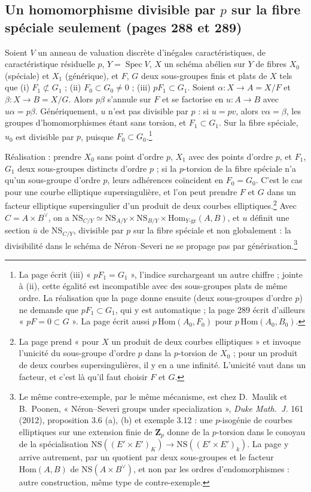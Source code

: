 \documentclass[11pt,a4paper]{article}
\begin{document}
\subsection*{Un homomorphisme divisible par $p$ sur la fibre spéciale seulement (pages 288 et 289)}

Soient $V$ un anneau de valuation discrète d'inégales caractéristiques,
de caractéristique résiduelle $p$, $Y = \operatorname{Spec} V$, $X$ un schéma
abélien sur $Y$ de fibres $X_0$ (spéciale) et $X_1$ (générique), et $F$, $G$
deux sous-groupes finis et plats de $X$ tels que (i) $F_1 \not\subset G_1$ ;
(ii) $F_0 \subset G_0 \neq 0$ ; (iii) $pF_1 \subset G_1$. Soient
$\alpha \colon X \to A = X/F$ et $\beta \colon X \to B = X/G$. Alors $p\beta$
s'annule sur $F$ et se factorise en $u \colon A \to B$ avec
$u\alpha = p\beta$. Génériquement, $u$ n'est pas divisible par $p$ : si
$u = pv$, alors $v\alpha = \beta$, les groupes d'homomorphismes étant sans
torsion, et $F_1 \subset G_1$. Sur la fibre spéciale, $u_0$ est divisible par
$p$, puisque $F_0 \subset G_0$.\footnote{La page écrit (iii) « $pF_1 = G_1$ »,
l'indice surchargeant un autre chiffre ; jointe à (ii), cette égalité est
incompatible avec des sous-groupes plats de même ordre. La réalisation que la
page donne ensuite (deux sous-groupes d'ordre $p$) ne demande que
$pF_1 \subset G_1$, qui y est automatique ; la page 289 écrit d'ailleurs
« $pF = 0 \subset G$ ». La page écrit aussi $p\,\mathrm{Hom}(A_0, F_0)$ pour
$p\,\mathrm{Hom}(A_0, B_0)$.}

Réalisation : prendre $X_0$ sans point d'ordre $p$, $X_1$ avec des points
d'ordre $p$, et $F_1$, $G_1$ deux sous-groupes distincts d'ordre $p$ ; si la
$p$-torsion de la fibre spéciale n'a qu'un sous-groupe d'ordre $p$, leurs
adhérences coïncident en $F_0 = G_0$. C'est le cas pour une courbe elliptique
supersingulière, et l'on peut prendre $F$ et $G$ dans un facteur elliptique
supersingulier d'un produit de deux courbes elliptiques.\footnote{La page
prend « pour $X$ un produit de deux courbes elliptiques » et invoque l'unicité
du sous-groupe d'ordre $p$ dans la $p$-torsion de $X_0$ ; pour un produit de
deux courbes supersingulières, il y en a une infinité. L'unicité vaut dans un
facteur, et c'est là qu'il faut choisir $F$ et $G$.} Avec
$C = A \times B^\vee$, on a
$\mathrm{NS}_{C/Y} \simeq \mathrm{NS}_{A/Y} \times \mathrm{NS}_{B/Y} \times \mathrm{Hom}_{Y\text{-gr}}(A, B)$,
et $u$ définit une section $\bar{u}$ de $\mathrm{NS}_{C/Y}$, divisible par $p$
sur la fibre spéciale et non globalement : la divisibilité dans le schéma de
Néron--Severi ne se propage pas par générisation.\footnote{Le même
contre-exemple, par le même mécanisme, est chez D.~Maulik et B.~Poonen,
« Néron--Severi groups under specialization », \emph{Duke Math.\ J.} 161
(2012), proposition 3.6 (a), (b) et exemple 3.12 : une $p$-isogénie de courbes
elliptiques sur une extension finie de $\mathbf{Z}_p$ donne de la $p$-torsion
dans le conoyau de la spécialisation
$\mathrm{NS}((E' \times E')_K) \to \mathrm{NS}((E' \times E')_k)$. La page y
arrive autrement, par un quotient par deux sous-groupes et le facteur
$\mathrm{Hom}(A, B)$ de $\mathrm{NS}(A \times B^\vee)$, et non par les ordres
d'endomorphismes : autre construction, même type de contre-exemple.}
\end{document}
